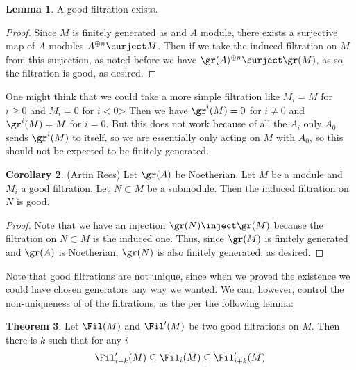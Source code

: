 \documentclass[12 pt]{article}
\theoremstyle{definition}
\newtheorem{theorem}{Theorem}[section]
\newtheorem{corollary}[theorem]{Corollary}
\newtheorem{lemma}[theorem]{Lemma}
\begin{document}
\begin{lemma} A good filtration exists.
\end{lemma}

\begin{proof} Since $M$ is finitely generated as and $A$ module, there exists a surjective map of $A$ modules $A^{\oplus n} \surject M$. Then if we take the induced filtration on $M$ from this surjection, as noted before we have $\gr(A)^{\oplus n} \surject \gr(M)$, as so the filtration is good, as desired.
\end{proof}

\begin{remark} One might think that we could take a more simple filtration like $M_i=M$ for $i \geq 0$ and $M_i=0$ for $i<0$> Then we have $\gr^i(M)=0$ for $i \neq 0$ and $\gr^i(M)=M$ for $i=0$. But this does not work because of all the $A_i$ only $A_0$ sends $\gr^i(M)$ to itself, so we are essentially only acting on $M$ with $A_0$, so this should not be expected to be finitely generated.
\end{remark}




\begin{corollary} (Artin Rees) Let $\gr(A)$ be Noetherian. Let $M$ be a module and $M_i$ a good filtration. Let $N \subset M$ be a submodule. Then the induced filtration on $N$ is good.
\label{artinrees1}
\end{corollary}
\begin{proof} Note that we have an injection $\gr(N) \inject \gr(M)$ because the filtration on $N \subset M$ is the induced one. Thus, since $\gr(M)$ is finitely generated and $\gr(A)$ is Noetherian, $\gr(N)$ is also finitely generated, as desired.
\end{proof}


Note that good filtrations are not unique, since when we proved the existence we could have chosen generators any way we wanted. We can, however, control the non-uniqueness of of the filtrations, as the per the following lemma:

\begin{theorem} Let $\Fil(M)$ and $\Fil'(M)$ be two good filtrations on $M$. Then there is $k$ such that for any $i$
\[\Fil_{i-k}'(M) \subseteq \Fil_i(M) \subseteq \Fil_{i+k}'(M)\]
\label{essnunique1}
\end{theorem}
\end{document}

